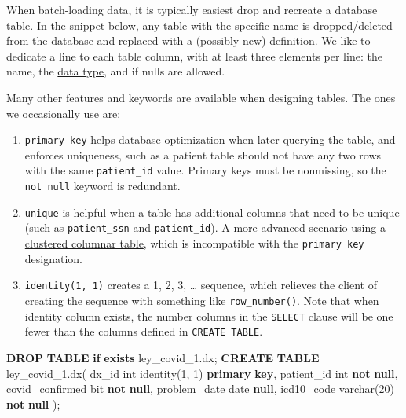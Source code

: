 \documentclass[
]{book}
\newenvironment{Shaded}{\begin{snugshade}}{\end{snugshade}}
\newcommand{\ControlFlowTok}[1]{\textcolor[rgb]{0.13,0.29,0.53}{\textbf{#1}}}
\newcommand{\DataTypeTok}[1]{\textcolor[rgb]{0.13,0.29,0.53}{#1}}
\newcommand{\DecValTok}[1]{\textcolor[rgb]{0.00,0.00,0.81}{#1}}
\newcommand{\KeywordTok}[1]{\textcolor[rgb]{0.13,0.29,0.53}{\textbf{#1}}}
\newcommand{\NormalTok}[1]{#1}
\providecommand{\tightlist}{%
  \setlength{\itemsep}{0pt}\setlength{\parskip}{0pt}}
\begin{document}
When batch-loading data, it is typically easiest drop and recreate a database table. In the snippet below, any table with the specific name is dropped/deleted from the database and replaced with a (possibly new) definition. We like to dedicate a line to each table column, with at least three elements per line: the name, the \href{https://docs.microsoft.com/en-us/sql/t-sql/data-types/data-types-transact-sql}{data type}, and if nulls are allowed.

Many other features and keywords are available when designing tables. The ones we occasionally use are:

\begin{enumerate}
\def\labelenumi{\arabic{enumi}.}
\tightlist
\item
  \href{https://www.w3schools.com/sql/sql_primarykey.ASP}{\texttt{primary\ key}} helps database optimization when later querying the table, and enforces uniqueness, such as a patient table should not have any two rows with the same \texttt{patient\_id} value. Primary keys must be nonmissing, so the \texttt{not\ null} keyword is redundant.
\item
  \href{https://www.w3schools.com/sql/sql_unique.asp}{\texttt{unique}} is helpful when a table has additional columns that need to be unique (such as \texttt{patient\_ssn} and \texttt{patient\_id}). A more advanced scenario using a \href{https://docs.microsoft.com/en-us/sql/relational-databases/indexes/columnstore-indexes-overview\#when-should-i-use-a-columnstore-index}{clustered columnar table}, which is incompatible with the \texttt{primary\ key} designation.
\item
  \texttt{identity(1,\ 1)} creates a 1, 2, 3, \ldots{} sequence, which relieves the client of creating the sequence with something like \href{https://docs.microsoft.com/en-us/sql/t-sql/functions/row-number-transact-sql}{\texttt{row\_number()}}. Note that when identity column exists, the number columns in the \texttt{SELECT} clause will be one fewer than the columns defined in \texttt{CREATE\ TABLE}.
\end{enumerate}

\begin{Shaded}
\begin{Highlighting}[]
\KeywordTok{DROP} \KeywordTok{TABLE} \ControlFlowTok{if} \KeywordTok{exists}\NormalTok{ ley\_covid\_1.dx;}
\KeywordTok{CREATE} \KeywordTok{TABLE}\NormalTok{ ley\_covid\_1.dx(}
\NormalTok{  dx\_id           }\DataTypeTok{int}\NormalTok{ identity(}\DecValTok{1}\NormalTok{, }\DecValTok{1}\NormalTok{) }\KeywordTok{primary} \KeywordTok{key}\NormalTok{,}
\NormalTok{  patient\_id      }\DataTypeTok{int}         \KeywordTok{not} \KeywordTok{null}\NormalTok{,}
\NormalTok{  covid\_confirmed bit         }\KeywordTok{not} \KeywordTok{null}\NormalTok{,}
\NormalTok{  problem\_date    }\DataTypeTok{date}            \KeywordTok{null}\NormalTok{,}
\NormalTok{  icd10\_code      }\DataTypeTok{varchar}\NormalTok{(}\DecValTok{20}\NormalTok{) }\KeywordTok{not} \KeywordTok{null}
\NormalTok{);}
\end{Highlighting}
\end{Shaded}
\end{document}
